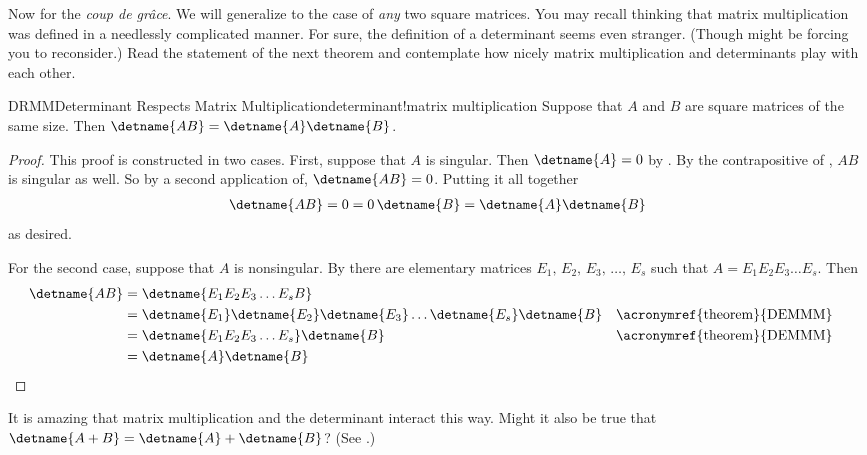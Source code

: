 %
Now for the {\it coup de gr\^{a}ce}.  We will generalize  to the case of {\em any} two square matrices.   You may recall thinking that matrix multiplication was defined in a needlessly complicated manner.  For sure, the definition of a determinant seems even stranger.  (Though  might be forcing you to reconsider.)  Read the statement of the next theorem and contemplate how nicely matrix multiplication and determinants play with each other.
%
\begin{theorem}{DRMM}{Determinant Respects Matrix Multiplication}{determinant!matrix multiplication}
Suppose that $A$ and $B$ are square matrices of the same size.  Then $\detname{AB}=\detname{A}\detname{B}$.
\end{theorem}
%
\begin{proof}
This proof is constructed in two cases.  First, suppose that $A$ is singular.  Then $\detname{A}=0$ by .  By the contrapositive of , $AB$ is singular as well.
So by a second application of, $\detname{AB}=0$.  Putting it all together
%
\begin{align*}
\detname{AB}=0=0\,\detname{B}=\detname{A}\detname{B}
\end{align*}
%
as desired.\par
%
For the second case, suppose that $A$ is nonsingular.  By  there are elementary matrices $E_{1},\,E_{2},\,E_{3},\,\dots,\,E_{s}$ such that $A=E_1E_2E_3\dots E_s$.
Then
%
\begin{align*}
\detname{AB}
&=
\detname{E_1E_2E_3\dots E_{s}B}\\
%
&=
\detname{E_1}\detname{E_2}\detname{E_3}\dots\detname{E_s}\detname{B}
&&\text{\acronymref{theorem}{DEMMM}}\\
%
&=
\detname{E_1E_2E_3\dots E_s}\detname{B}
&&\text{\acronymref{theorem}{DEMMM}}\\
%
&=
\detname{A}\detname{B}
%
\end{align*}
%
\end{proof}
%
It is amazing that matrix multiplication and the determinant interact this way.  Might it also be true that $\detname{A+B}=\detname{A}+\detname{B}$?  (See .)
%
%
